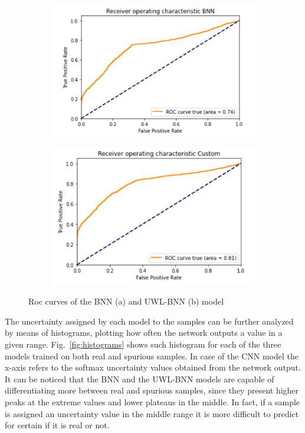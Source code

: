 \documentclass[11pt,twoside,a4paper]{article}
\begin{document}
\begin{figure}[!b]
    \centering
    \begin{subfigure}{0.49\textwidth}
	\includegraphics[width=\linewidth]{ROC_BNN.png}
        \caption{}
    \end{subfigure}
    \begin{subfigure}{0.49\textwidth}
	\includegraphics[width=\linewidth]{ROC_Custom.png}
        \caption{}
    \end{subfigure}
    \caption{Roc curves of the BNN (a) and UWL-BNN (b) model}
    \label{fig:roc}
\end{figure}

The uncertainty assigned by each model to the samples can be further analyzed by means of histograms, plotting how often the network outputs a value in a given range. Fig.~\ref{fig:histograms} shows such histogram for each of the three models trained on both real and spurious samples. In case of the CNN model the x-axis refers to the softmax uncertainty values obtained from the network output. It can be noticed that the BNN and the UWL-BNN models are capable of differentiating more between real and spurious samples, since they present higher peaks at the extreme values and lower plateaus in the middle. In fact, if a sample is assigned an uncertainty value in the middle range it is more difficult to predict for certain if it is real or not.
\end{document}
